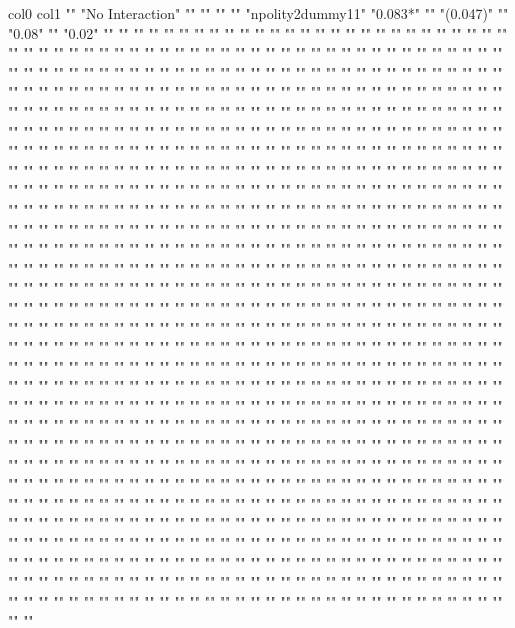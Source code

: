 col0	col1
""	"No Interaction"
""	""
""	""
"npolity2dummy11"	"0.083*"
""	"(0.047)"
""	"0.08"
""	"0.02"
""	""
""	""
""	""
""	""
""	""
""	""
""	""
""	""
""	""
""	""
""	""
""	""
""	""
""	""
""	""
""	""
""	""
""	""
""	""
""	""
""	""
""	""
""	""
""	""
""	""
""	""
""	""
""	""
""	""
""	""
""	""
""	""
""	""
""	""
""	""
""	""
""	""
""	""
""	""
""	""
""	""
""	""
""	""
""	""
""	""
""	""
""	""
""	""
""	""
""	""
""	""
""	""
""	""
""	""
""	""
""	""
""	""
""	""
""	""
""	""
""	""
""	""
""	""
""	""
""	""
""	""
""	""
""	""
""	""
""	""
""	""
""	""
""	""
""	""
""	""
""	""
""	""
""	""
""	""
""	""
""	""
""	""
""	""
""	""
""	""
""	""
""	""
""	""
""	""
""	""
""	""
""	""
""	""
""	""
""	""
""	""
""	""
""	""
""	""
""	""
""	""
""	""
""	""
""	""
""	""
""	""
""	""
""	""
""	""
""	""
""	""
""	""
""	""
""	""
""	""
""	""
""	""
""	""
""	""
""	""
""	""
""	""
""	""
""	""
""	""
""	""
""	""
""	""
""	""
""	""
""	""
""	""
""	""
""	""
""	""
""	""
""	""
""	""
""	""
""	""
""	""
""	""
""	""
""	""
""	""
""	""
""	""
""	""
""	""
""	""
""	""
""	""
""	""
""	""
""	""
""	""
""	""
""	""
""	""
""	""
""	""
""	""
""	""
""	""
""	""
""	""
""	""
""	""
""	""
""	""
""	""
""	""
""	""
""	""
""	""
""	""
""	""
""	""
""	""
""	""
""	""
""	""
""	""
""	""
""	""
""	""
""	""
""	""
""	""
""	""
""	""
""	""
""	""
""	""
""	""
""	""
""	""
""	""
""	""
""	""
""	""
""	""
""	""
""	""
""	""
""	""
""	""
""	""
""	""
""	""
""	""
""	""
""	""
""	""
""	""
""	""
""	""
""	""
""	""
""	""
""	""
""	""
""	""
""	""
""	""
""	""
""	""
""	""
""	""
""	""
""	""
""	""
""	""
""	""
""	""
""	""
""	""
""	""
""	""
""	""
""	""
""	""
""	""
""	""
""	""
""	""
""	""
""	""
""	""
""	""
""	""
""	""
""	""
""	""
""	""
""	""
""	""
""	""
""	""
""	""
""	""
""	""
""	""
""	""
""	""
""	""
""	""
""	""
""	""
""	""
""	""
""	""
""	""
""	""
""	""
""	""
""	""
""	""
""	""
""	""
""	""
""	""
""	""
""	""
""	""
""	""
""	""
""	""
""	""
""	""
""	""
""	""
""	""
""	""
""	""
""	""
""	""
""	""
""	""
""	""
""	""
""	""
""	""
""	""
""	""
""	""
""	""
""	""
""	""
""	""
""	""
""	""
""	""
""	""
""	""
""	""
""	""
""	""
""	""
""	""
""	""
""	""
""	""
""	""
""	""
""	""
""	""
""	""
""	""
""	""
""	""
""	""
""	""
""	""
""	""
""	""
""	""
""	""
""	""
""	""
""	""
""	""
""	""
""	""
""	""
""	""
""	""
""	""
""	""
""	""
""	""
""	""
""	""
""	""
""	""
""	""
""	""
""	""
""	""
""	""
""	""
""	""
""	""
""	""
""	""
""	""
""	""
""	""
""	""
""	""
""	""
""	""
""	""
""	""
""	""
""	""
""	""
""	""
""	""
""	""
""	""
""	""
""	""
""	""
""	""
""	""
""	""
""	""
""	""
""	""
""	""
""	""
""	""
""	""
""	""
""	""
""	""
""	""
""	""
""	""
""	""
""	""
""	""
""	""
""	""
""	""
""	""
""	""
""	""
""	""
""	""
""	""
""	""
""	""
""	""
""	""
""	""
""	""
""	""
""	""
""	""
""	""
""	""
""	""
""	""
""	""
""	""
""	""
""	""
""	""
""	""
""	""
""	""
""	""
""	""
""	""
""	""
""	""
""	""
""	""
""	""
""	""
""	""
""	""
""	""
""	""
""	""
""	""
""	""
""	""
""	""
""	""
""	""
""	""
""	""
""	""
""	""
""	""
""	""
""	""
""	""
""	""
""	""
""	""
""	""
""	""
""	""
""	""
""	""
""	""
""	""
""	""
""	""
""	""
""	""
""	""
""	""
""	""
""	""
""	""
""	""
""	""
""	""
""	""
""	""
""	""
""	""
""	""
""	""
""	""
""	""
""	""
""	""
